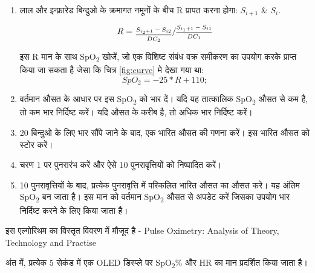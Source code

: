 		\begin{enumerate}
			\item लाल और इन्फ़्रारेड बिन्दुओ के क्रमागत नमूनों के बीच R प्रापत करना होगा: $S_{i+1}$ \& $S_{i}$. 
			
			\[
				R = \sfrac{\frac{S_{i_2+1} - S_{i2}}{DC_2}}{\frac{S_{i_1+1} - 		S_{i1}}{DC_1}}
			\]	
			
			इस R मान के साथ SpO\textsubscript{2} खोजें, जो एक विशिष्ट संबंध वक्र समीकरण का उपयोग करके प्राप्त किया जा सकता है जेसा कि चित्र \ref{fig:curve} मे देखा गया था:
			\[		
			SpO_2 = -25*R + 110;
			\]
			
			\item वर्तमान औसत के आधार पर इस SpO\textsubscript{2} को भार दें। यदि यह तात्कालिक SpO\textsubscript{2} औसत से कम है, तो कम भार निर्दिष्ट करें। यदि औसत के करीब है, तो अधिक भार निर्दिष्ट करें। 
			
			\item 20 बिन्दुओ के लिए भार सौंपे जाने के बाद, एक भारित औसत की गणना करें। इस भारित औसत को स्टोर करें।
			
			\item चरण 1 पर पुनरारंभ करें और ऐसे 10 पुनरावृत्तियों को निष्पादित करें।
			
			\item 10 पुनरावृत्तियों के बाद, प्रत्येक पुनरावृत्ति में परिकलित भारित औसत का औसत करे। यह अंतिम SpO\textsubscript{2} बन जाता है। इस मान को वर्तमान SpO\textsubscript{2} औसत से अपडेट करें जिसका उपयोग भार निर्दिष्ट करने के लिए किया जाता है।

		\end{enumerate}
	
		इस एल्गोरिथम का विस्तृत विवरण में मौजूद है - Pulse Oximetry: Analysis of Theory, Technology and Practise\cite{wuk}		
			
			
		अंत में, प्रत्येक 5 सेकंड में एक OLED डिस्प्ले पर SpO\textsubscript{2}\% और HR का मान प्रदर्शित किया जाता है।	